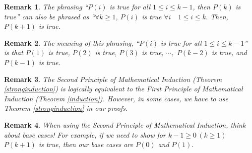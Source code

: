 \documentclass[12pt,a4paper]{article}
\newtheorem*{rmk}{\indent Remark}
\begin{document}
\begin{rmk} 
	The phrasing ``$P(i)$ is true for all $1\leq i\leq k-1$, then $P(k)$ is true'' can also be phrased as ``$\forall k\geq1$, $P(i)$ is true $\forall i\quad1\leq i\leq k.$ Then, $P(k+1)$ is true.
\end{rmk}
\begin{rmk}
	The meaning of this phrasing, ``$P(i)$ is true for all $1\leq i\leq k-1$'' is that $P(1)$ is true, $P(2)$ is true, $P(3)$ is true, $\cdots,$ $P(k-2)$ is true, and $P(k-1)$ is true.
\end{rmk}
\begin{rmk}
	The Second Principle of Mathematical Induction (Theorem \ref{stronginduction}) is logically equivalent to the First Principle of Mathematical Induction (Theorem \ref{induction}). However, in some cases, we have to use Theorem \ref{stronginduction} in our proofs.\end{rmk}
\begin{rmk}
	When using the Second Principle of Mathematical Induction, think about base cases! For example, if we need to show for $k-1\geq0\ (k\geq1)$ $P(k+1)$	is true, then our base cases are $P(0)$ and $P(1).$
\end{rmk}
\end{document}
